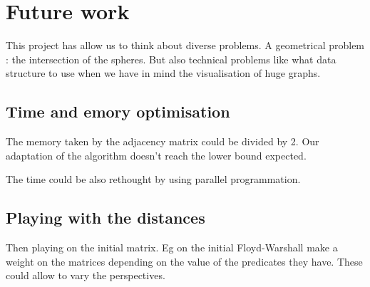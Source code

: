\documentclass{article}
\begin{document}
\section{Future work}
This project has allow us to think about diverse problems. A geometrical problem : the intersection of the spheres. But also technical problems like what data structure to use when we have in mind the visualisation of huge graphs.


\subsection{Time and emory optimisation}
The memory taken by the adjacency matrix could be divided by 2. Our adaptation of the algorithm doesn't reach the lower bound expected. 

The time could be also rethought by using parallel programmation. 


\subsection{Playing with the distances}
Then playing on the initial matrix. Eg on the initial Floyd-Warshall make a weight on the matrices depending on the value of the predicates they have. These could allow to vary the perspectives.

\printbibliography[
heading=bibintoc,
title={Bibliography}
]
\end{document}
